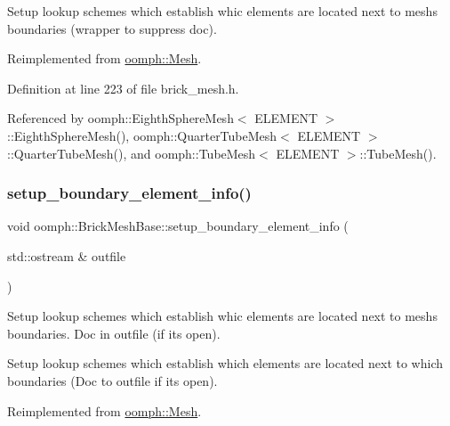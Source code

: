 Setup lookup schemes which establish whic elements are located next to mesh\textquotesingle{}s boundaries (wrapper to suppress doc). 

Reimplemented from \hyperlink{classoomph_1_1Mesh_a6cc8bcd6b41209f0e9295cc993d9c6bb}{oomph\+::\+Mesh}.



Definition at line 223 of file brick\+\_\+mesh.\+h.



Referenced by oomph\+::\+Eighth\+Sphere\+Mesh$<$ E\+L\+E\+M\+E\+N\+T $>$\+::\+Eighth\+Sphere\+Mesh(), oomph\+::\+Quarter\+Tube\+Mesh$<$ E\+L\+E\+M\+E\+N\+T $>$\+::\+Quarter\+Tube\+Mesh(), and oomph\+::\+Tube\+Mesh$<$ E\+L\+E\+M\+E\+N\+T $>$\+::\+Tube\+Mesh().

\mbox{\label{classoomph_1_1BrickMeshBase_a26aa6ff19735538e598bee956ad3d957}} 
\subsubsection{\texorpdfstring{setup\+\_\+boundary\+\_\+element\+\_\+info()}{setup\_boundary\_element\_info()}\hspace{0.1cm}{\footnotesize\ttfamily [2/2]}}
{\footnotesize\ttfamily void oomph\+::\+Brick\+Mesh\+Base\+::setup\+\_\+boundary\+\_\+element\+\_\+info (\begin{DoxyParamCaption}\item[{std\+::ostream \&}]{outfile }\end{DoxyParamCaption})\hspace{0.3cm}{\ttfamily [virtual]}}



Setup lookup schemes which establish whic elements are located next to mesh\textquotesingle{}s boundaries. Doc in outfile (if it\textquotesingle{}s open). 

Setup lookup schemes which establish which elements are located next to which boundaries (Doc to outfile if it\textquotesingle{}s open). 

Reimplemented from \hyperlink{classoomph_1_1Mesh_a413cbcbea4fb1111703da9ee97429640}{oomph\+::\+Mesh}.



